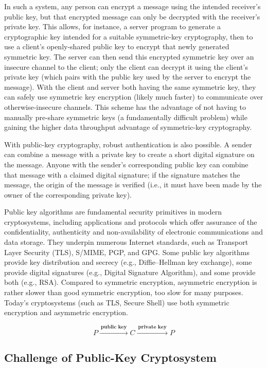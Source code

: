 \documentclass[british]{report}
\begin{document}
In such a system, any person can encrypt a message using the intended
receiver's public key, but that encrypted message can only be decrypted
with the receiver's private key. This allows, for instance, a server
program to generate a cryptographic key intended for a suitable symmetric-key
cryptography, then to use a client's openly-shared public key to encrypt
that newly generated symmetric key. The server can then send this
encrypted symmetric key over an insecure channel to the client; only
the client can decrypt it using the client's private key (which pairs
with the public key used by the server to encrypt the message). With
the client and server both having the same symmetric key, they can
safely use symmetric key encryption (likely much faster) to communicate
over otherwise-insecure channels. This scheme has the advantage of
not having to manually pre-share symmetric keys (a fundamentally difficult
problem) while gaining the higher data throughput advantage of symmetric-key
cryptography.

With public-key cryptography, robust authentication is also possible.
A sender can combine a message with a private key to create a short
digital signature on the message. Anyone with the sender's corresponding
public key can combine that message with a claimed digital signature;
if the signature matches the message, the origin of the message is
verified (i.e., it must have been made by the owner of the corresponding
private key).

Public key algorithms are fundamental security primitives in modern
cryptosystems, including applications and protocols which offer assurance
of the confidentiality, authenticity and non-availability of electronic
communications and data storage. They underpin numerous Internet standards,
such as Transport Layer Security (TLS), S/MIME, PGP, and GPG. Some
public key algorithms provide key distribution and secrecy (e.g.,
Diffie--Hellman key exchange), some provide digital signatures (e.g.,
Digital Signature Algorithm), and some provide both (e.g., RSA). Compared
to symmetric encryption, asymmetric encryption is rather slower than
good symmetric encryption, too slow for many purposes. Today's cryptosystems
(such as TLS, Secure Shell) use both symmetric encryption and asymmetric
encryption.

\[
	P\xrightarrow{\:\textbf{public key}\:}C\xrightarrow{\:\textbf{private key}\:}P
\]

\medskip{}


\subsection{Challenge of Public-Key Cryptosystem}
\end{document}
